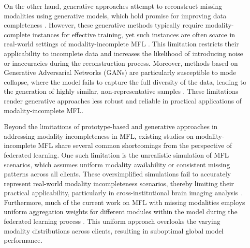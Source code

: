 On the other hand, generative approaches attempt to reconstruct missing modalities using generative models, which hold promise for improving data completeness \cite{FedMed-GAN,CACMRN, wu2024deep}. However, these generative methods typically require modality-complete instances for effective training, yet such instances are often scarce in real-world settings of modality-incomplete MFL \cite{CACMRN}. This limitation restricts their applicability to incomplete data and increases the likelihood of introducing noise or inaccuracies during the reconstruction process. Moreover, methods based on Generative Adversarial Networks (GANs) \cite{goodfellow2020generative} are particularly susceptible to mode collapse,  where the model fails to capture the full diversity of the data, leading to the generation of highly similar, non-representative samples \cite{model_collapse1,model_collapse2}. These limitations render generative approaches less robust and reliable in practical applications of modality-incomplete MFL.

Beyond the limitations of prototype-based and generative approaches in addressing modality incompleteness in MFL, existing studies on modality-incomplete MFL share several common shortcomings from the perspective of federated learning. One such limitation is the unrealistic simulation of MFL scenarios, which assumes uniform modality availability or consistent missing patterns across all clients. These oversimplified simulations fail to accurately represent real-world modality incompleteness scenarios, thereby limiting their practical applicability, particularly in cross-institutional brain imaging analysis \cite{FedMAC}. Furthermore, much of the current work on MFL with missing modalities employs uniform aggregation weights for different modules within the model during the federated learning process \cite{10654835}. This uniform approach overlooks the varying modality distributions across clients, resulting in suboptimal global model performance.



